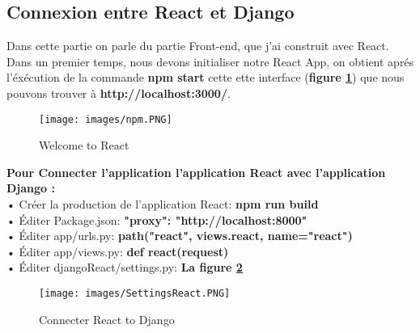 \subsection{Connexion entre React et Django}
Dans cette partie on parle du partie Front-end, que j'ai construit avec React.\\
Dans un premier temps, nous devons initialiser notre React App, on obtient aprés l'éxécution de la commande \textbf{npm start} cette ette interface (\textbf{figure \ref{fig:npm1}}) que nous pouvons trouver à \textbf{http://localhost:3000/}.
\begin{figure}[H]
            \centering
            \texttt{[image: images/npm.PNG]}
            \caption{Welcome to React}
            \label{fig:npm1}  
        \end{figure}
\newpage
\noindent\textbf{Pour Connecter l'application l'application React avec l'application Django :}\\
\indent• Créer la production de l'application React: \textbf{npm run build}\\
\indent• Éditer Package.json: \textbf{"proxy": "http://localhost:8000"}\\
\indent• Éditer app/urls.py: \textbf{path("react", views.react, name="react")}\\
\indent• Éditer app/views.py: \textbf{def react(request)}\\
\indent• Éditer djangoReact/settings.py: \textbf{La figure \ref{fig:connect}}
\begin{figure}[H]
            \centering
            \texttt{[image: images/SettingsReact.PNG]}
            \caption{Connecter React to Django}
            \label{fig:connect}  
        \end{figure}
